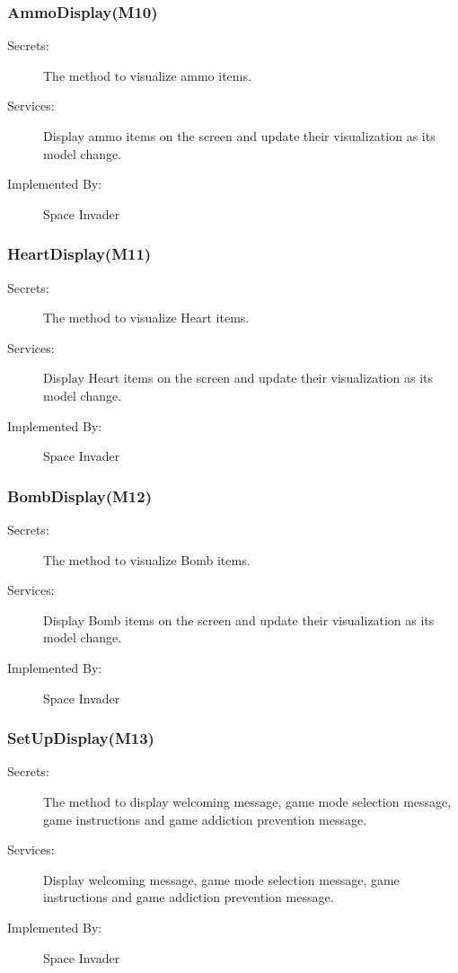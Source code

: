 \documentclass[12pt]{article}
\begin{document}
\subsubsection{AmmoDisplay(M10)}
\begin{description}
\item[Secrets:] The method to visualize ammo items.
\item[Services:] Display ammo items on the screen and update their visualization as its model change.
\item[Implemented By:] Space Invader
\end{description}

\subsubsection{HeartDisplay(M11)}
\begin{description}
\item[Secrets:] The method to visualize Heart items.
\item[Services:] Display Heart items on the screen and update their visualization as its model change.
\item[Implemented By:] Space Invader
\end{description}

\subsubsection{BombDisplay(M12)}
\begin{description}
\item[Secrets:] The method to visualize Bomb items.
\item[Services:] Display Bomb items on the screen and update their visualization as its model change.
\item[Implemented By:] Space Invader
\end{description}

\subsubsection{SetUpDisplay(M13)}
\begin{description}
\item[Secrets:] The method to display welcoming message, game mode selection message, game instructions and game addiction prevention message.
\item[Services:]Display welcoming message, game mode selection message, game instructions and game addiction prevention message.
\item[Implemented By:] Space Invader
\end{description}
\end{document}
